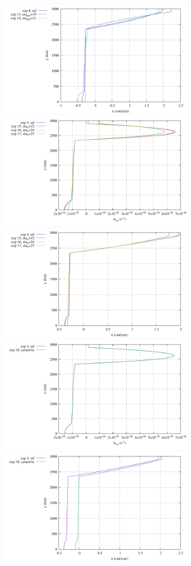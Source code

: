 \begin{center}
\includegraphics[width=8cm]{python_codes/fieldstone_148/results/fig3_u_middle}\\
\includegraphics[width=8cm]{python_codes/fieldstone_148/results/fig4_exx_middle}
\includegraphics[width=8cm]{python_codes/fieldstone_148/results/fig4_u_middle}\\
\includegraphics[width=8cm]{python_codes/fieldstone_148/results/fig5_exx_middle}
\includegraphics[width=8cm]{python_codes/fieldstone_148/results/fig5_u_middle}\\
\end{center}







